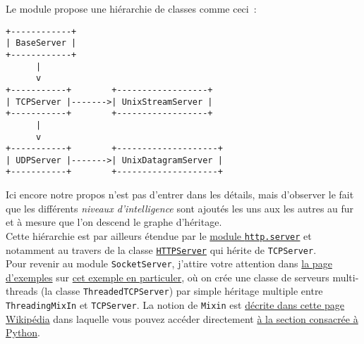 Le module propose une hiérarchie de classes comme ceci~:

    \begin{verbatim}
+------------+
| BaseServer |
+------------+
      |
      v
+-----------+        +------------------+
| TCPServer |------->| UnixStreamServer |
+-----------+        +------------------+
      |
      v
+-----------+        +--------------------+
| UDPServer |------->| UnixDatagramServer |
+-----------+        +--------------------+
\end{verbatim}

    Ici encore notre propos n'est pas d'entrer dans les détails, mais
d'observer le fait que les différents \emph{niveaux d'intelligence} sont
ajoutés les uns aux les autres au fur et à mesure que l'on descend le
graphe d'héritage.\\

Cette hiérarchie est par ailleurs étendue par le
\href{https://docs.python.org/3/library/http.server.html}{module
\texttt{http.server}} et notamment au travers de la classe
\href{https://docs.python.org/3/library/http.server.html\#http.server.HTTPServer}{\texttt{HTTPServer}}
qui hérite de \texttt{TCPServer}.\\

    Pour revenir au module \texttt{SocketServer}, j'attire votre attention
dans
\href{https://docs.python.org/3/library/socketserver.html\#examples}{la
page d'exemples} sur
\href{https://docs.python.org/3/library/socketserver.html\#asynchronous-mixins}{cet
exemple en particuler}, où on crée une classe de serveurs multi-threads
(la classe \texttt{ThreadedTCPServer}) par simple héritage multiple
entre \texttt{ThreadingMixIn} et \texttt{TCPServer}. La notion de
\texttt{Mixin} est \href{http://en.wikipedia.org/wiki/Mixin}{décrite
dans cette page Wikipédia} dans laquelle vous pouvez accéder directement
\href{http://en.wikipedia.org/wiki/Mixin\#In_Python}{à la section
consacrée à Python}.